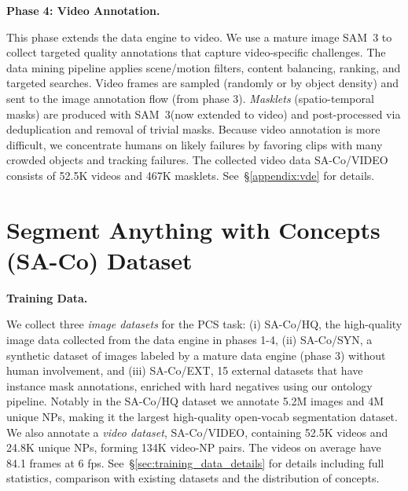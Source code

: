 \documentclass[]{fairmeta}
\newcommand{\model}{SAM~3\xspace}
\newcommand{\task}{PCS\xspace}
\newcommand{\dsname}{{SA-Co}\xspace}
\newcommand{\trainhq}{{\dsname/HQ}\xspace}
\newcommand{\trainsyn}{{\dsname/SYN}\xspace}
\newcommand{\trainext}{{\dsname/EXT}\xspace}
\newcommand{\trainvid}{{\dsname/VIDEO}\xspace}
\newcommand{\hqvocab}{4M\xspace}
\newcommand{\hqimgs}{5.2M\xspace}
\newcommand{\vidvocab}{24.8K\xspace}
\newcommand{\vidvideos}{52.5K\xspace}
\newcommand{\vidmasklets}{467K\xspace}
\newcommand{\vidvideonps}{134K\xspace}
\newcommand{\vidavglength}{84.1\xspace}
\renewcommand{\paragraph}[1]{%
	\noindent\textbf{#1.}\noindent\xspace%
}
\begin{document}
\paragraph{Phase 4: Video Annotation}
This phase extends the data engine to video. We use a mature image \model to collect targeted quality annotations that capture video-specific challenges. %
The data mining pipeline applies scene/motion filters, content balancing, ranking, and targeted searches. Video frames are sampled (randomly or by object density) and sent to the image annotation flow (from phase 3). \emph{Masklets} (spatio-temporal masks) are produced with \model (now extended to video) and post-processed via deduplication and removal of trivial masks. Because video annotation is more difficult, we concentrate humans on likely failures by favoring clips with many crowded objects and tracking failures. %
The collected video data \trainvid consists of \vidvideos videos and \vidmasklets masklets. See~\S\ref{appendix:vde} for details.




\vspace{-0.2cm}
\section{Segment Anything with Concepts (\dsname) Dataset} 
\label{sec:benchmark}
\vspace{-0.2cm}

\paragraph{Training Data}
We collect three \emph{image datasets} for the \task task: (i) \trainhq, the high-quality image data collected from the data engine in phases 1-4, (ii) \trainsyn, a synthetic dataset of images labeled by a mature data engine (phase 3) without human involvement, and (iii) \trainext, 15 external datasets that have instance mask annotations, enriched with hard negatives using our ontology pipeline.
Notably in the \trainhq dataset we annotate \hqimgs images and \hqvocab unique NPs, making it the largest high-quality open-vocab segmentation dataset.
We also annotate a \emph{video dataset}, \trainvid, containing \vidvideos videos and \vidvocab unique NPs, forming \vidvideonps video-NP pairs. The videos on average have \vidavglength frames at 6 fps.
See~\S\ref{sec:training_data_details} for details including full statistics, comparison with existing datasets and the distribution of concepts. 
\end{document}
